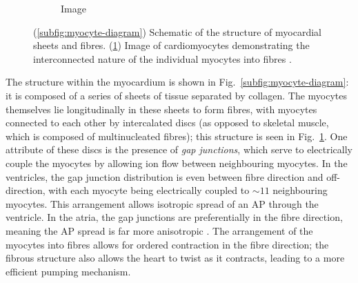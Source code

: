 \documentclass[../thesis-main.tex]{subfiles}
\begin{document}
\begin{figure}
\begin{subfigure}[b]{0.45\textwidth}
   \caption{Image}
   \label{subfig:myocyte-image}
  \end{subfigure}
  \caption[Structure of myocardial sheets and fibres]{(\ref{subfig:myocyte-diagram}) Schematic of the structure of myocardial sheets and fibres. (\ref{subfig:myocyte-image}) Image of cardiomyocytes demonstrating the interconnected nature of the individual myocytes into fibres \citep{Girod2006}.}
  \label{fig:myocyte-structure}
 \end{figure}
 
 The structure within the myocardium is shown in Fig.~\ref{subfig:myocyte-diagram}: it is composed of a series of sheets of tissue separated by collagen. The myocytes themselves lie longitudinally in these sheets to form fibres, with myocytes connected to each other by intercalated discs (as opposed to skeletal muscle, which is composed of multinucleated fibres); this structure is seen in Fig.~\ref{subfig:myocyte-image}. One attribute of these discs is the presence of \emph{gap junctions}, which serve to electrically couple the myocytes by allowing ion flow between neighbouring myocytes. In the ventricles, the gap junction distribution is even between fibre direction and off-direction, with each myocyte being electrically coupled to $\sim11$ neighbouring myocytes. This arrangement allows isotropic spread of an AP through the ventricle. In the atria, the gap junctions are preferentially in the fibre direction, meaning the AP spread is far more anisotropic \citep{Saffitz1994}. The arrangement of the myocytes into fibres allows for ordered contraction in the fibre direction; the fibrous structure also allows the heart to twist as it contracts, leading to a more efficient pumping mechanism.
 
\end{document}
